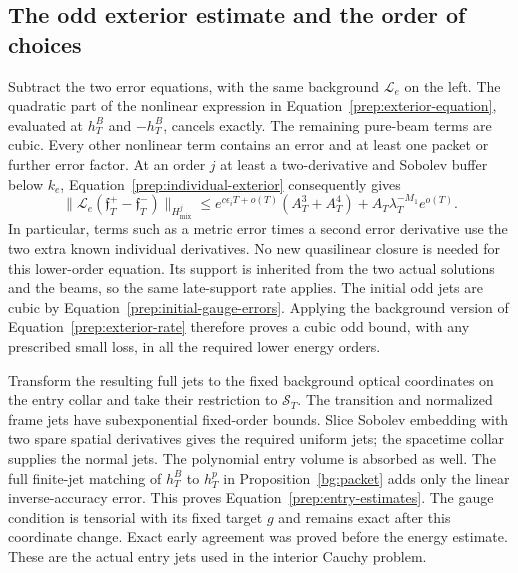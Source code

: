 \subsection{The odd exterior estimate and the order of choices}

Subtract the two error equations, with the same background
$\mathcal L_e$ on the left.  The quadratic part of the nonlinear
expression in Equation~\eqref{prep:exterior-equation}, evaluated at
$h_T^B$ and $-h_T^B$, cancels exactly.  The remaining pure-beam
terms are cubic.  Every other nonlinear term contains an error
and at least one packet or further error factor.  At an order
$j$ at least a two-derivative and Sobolev buffer below $k_e$,
Equation~\eqref{prep:individual-exterior} consequently gives
\begin{equation}\label{prep:odd-exterior-source}
 \|\mathcal L_e(\mathfrak f_T^+-\mathfrak f_T^-)\|_{H^j_{\mathrm{mix}}}
 \le e^{c\epsilon_iT+o(T)}(A_T^3+A_T^4)
          +A_T\lambda_T^{-M_1}e^{o(T)}.
\end{equation}
In particular, terms such as a metric error times a second error
derivative use the two extra known individual derivatives.
No new quasilinear closure is needed for this lower-order equation.
Its support is inherited from the two actual solutions and the
beams, so the same late-support rate applies.  The initial odd jets
are cubic by Equation~\eqref{prep:initial-gauge-errors}.  Applying
the background version of Equation~\eqref{prep:exterior-rate}
therefore proves a cubic odd bound, with any prescribed small
loss, in all the required lower energy orders.

Transform the resulting full jets to the fixed background optical
coordinates on the entry collar and take their restriction to
$\mathcal S_T$.  The transition and normalized frame jets have
subexponential fixed-order bounds.  Slice Sobolev embedding with
two spare spatial derivatives gives the required uniform jets;
the spacetime collar supplies the normal jets.  The polynomial
entry volume is absorbed as well.  The full finite-jet matching
of $h_T^B$ to $h_T^p$ in Proposition~\ref{bg:packet} adds only the
linear inverse-accuracy error.  This proves
Equation~\eqref{prep:entry-estimates}.  The gauge condition is
tensorial with its fixed target $g$ and remains exact after this
coordinate change.  Exact early agreement was proved before the
energy estimate.  These are the actual entry jets used in the
interior Cauchy problem.

